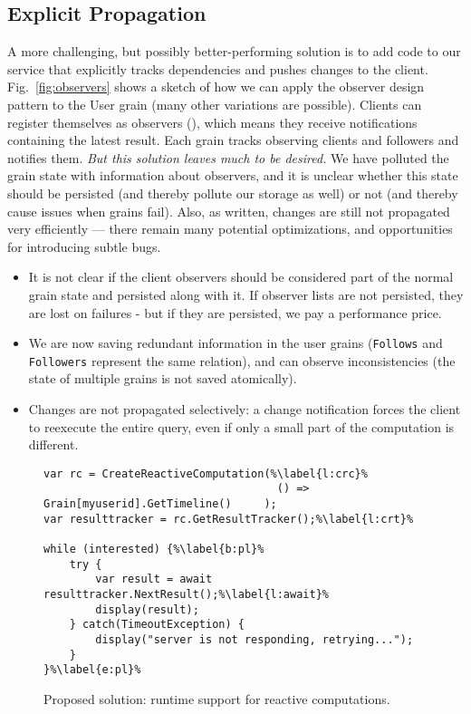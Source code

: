 \subsection{Explicit Propagation}\label{sec:observers}

A more challenging, but possibly better-performing solution is to add code to our service that explicitly tracks dependencies and pushes changes to the client. Fig.~\ref{fig:observers} shows a sketch of how we can apply the observer design pattern to the User grain (many other variations are possible). Clients can register themselves as observers (), which means they receive notifications containing the latest result. Each grain  tracks observing clients and followers and notifies them. \emph{But this solution leaves much to be desired. } We have polluted the grain state with information about observers, and it is unclear whether this state should be persisted (and thereby pollute our storage as well) or not (and thereby cause issues when grains fail). Also, as written, changes are still not propagated very efficiently --- there remain many potential optimizations, and opportunities for introducing subtle bugs. 

\hidden
{\begin{itemize}
\item It is not clear if the client observers should be considered part of the normal grain state and persisted along with it. If observer lists are not persisted, they are lost on failures - but if they are persisted, we pay a performance price.
\item We are now saving redundant information in the user grains (\lstinline{Follows} and \lstinline{Followers} represent the same relation), and can observe inconsistencies  (the state of multiple grains is not saved atomically).  
\item Changes are not propagated selectively: a change notification forces the client to reexecute the entire query, even if only a small part of the computation is different.
\end{itemize}
}



\begin{figure}
\begin{lstlisting}
var rc = CreateReactiveComputation(%\label{l:crc}%
									() => Grain[myuserid].GetTimeline()   	);
var resulttracker = rc.GetResultTracker();%\label{l:crt}%

while (interested) {%\label{b:pl}%
	try {
		var result = await resulttracker.NextResult();%\label{l:await}%
		display(result);
	} catch(TimeoutException) { 
		display("server is not responding, retrying...");
	}
}%\label{e:pl}%
\end{lstlisting}
\caption{Proposed solution: runtime support for reactive computations.}\label{fig:rcapi}
\end{figure}


